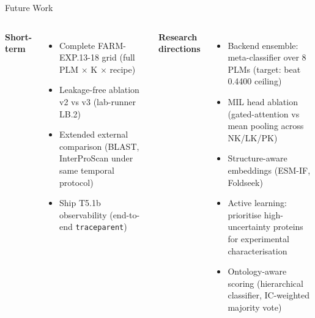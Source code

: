 \documentclass[12pt, aspectratio=169]{beamer}
\begin{document}
\begin{frame}{Future Work}
  \begin{columns}[t]
      \textbf{Short-term}
      \begin{itemize}
        \item Complete FARM-EXP.13-18 grid (full PLM $\times$ K $\times$ recipe)
        \item Leakage-free ablation v2 vs v3 (lab-runner LB.2)
        \item Extended external comparison (BLAST, InterProScan under same temporal protocol)
        \item Ship T5.1b observability (end-to-end \texttt{traceparent})
      \end{itemize}
      \textbf{Research directions}
      \begin{itemize}
        \item Backend ensemble: meta-classifier over 8 PLMs (target: beat 0.4400 ceiling)
        \item MIL head ablation (gated-attention vs mean pooling across NK/LK/PK)
        \item Structure-aware embeddings (ESM-IF, Foldseek)
        \item Active learning: prioritise high-uncertainty proteins for experimental characterisation
        \item Ontology-aware scoring (hierarchical classifier, IC-weighted majority vote)
      \end{itemize}
  \end{columns}
\end{frame}
\end{document}
